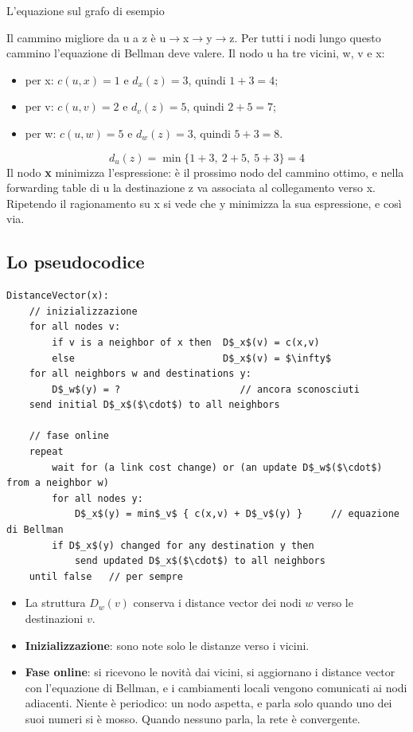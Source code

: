 \begin{esempio}{L'equazione sul grafo di esempio}
\begin{center}
\end{center}
Il cammino migliore da u a z è u$\rightarrow$x$\rightarrow$y$\rightarrow$z. Per tutti i nodi lungo questo cammino l'equazione di
Bellman deve valere. Il nodo u ha tre vicini, w, v e x:
\begin{itemize}
    \item per x: $c(u,x) = 1$ e $d_x(z) = 3$, quindi $1 + 3 = 4$;
    \item per v: $c(u,v) = 2$ e $d_v(z) = 5$, quindi $2 + 5 = 7$;
    \item per w: $c(u,w) = 5$ e $d_w(z) = 3$, quindi $5 + 3 = 8$.
\end{itemize}
$$d_u(z) = \min\{1+3,\ 2+5,\ 5+3\} = 4$$
Il nodo \textbf{x} minimizza l'espressione: è il prossimo nodo del cammino ottimo, e nella forwarding table di u la destinazione z
va associata al collegamento verso x. Ripetendo il ragionamento su x si vede che y minimizza la sua espressione, e così via.
\end{esempio}

\subsection{Lo pseudocodice}

\begin{lstlisting}[mathescape=true, title={Distance Vector, eseguito da ogni nodo $x$}]
DistanceVector(x):
    // inizializzazione
    for all nodes v:
        if v is a neighbor of x then  D$_x$(v) = c(x,v)
        else                          D$_x$(v) = $\infty$
    for all neighbors w and destinations y:
        D$_w$(y) = ?                     // ancora sconosciuti
    send initial D$_x$($\cdot$) to all neighbors

    // fase online
    repeat
        wait for (a link cost change) or (an update D$_w$($\cdot$) from a neighbor w)
        for all nodes y:
            D$_x$(y) = min$_v$ { c(x,v) + D$_v$(y) }     // equazione di Bellman
        if D$_x$(y) changed for any destination y then
            send updated D$_x$($\cdot$) to all neighbors
    until false   // per sempre
\end{lstlisting}

\begin{itemize}
    \item La struttura $D_w(v)$ conserva i distance vector dei nodi $w$ verso le destinazioni $v$.
    \item \textbf{Inizializzazione}: sono note solo le distanze verso i vicini.
    \item \textbf{Fase online}: si ricevono le novità dai vicini, si aggiornano i distance vector con l'equazione di Bellman, e i
          cambiamenti locali vengono comunicati ai nodi adiacenti. Niente è periodico: un nodo aspetta, e parla solo quando uno
          dei suoi numeri si è mosso. Quando nessuno parla, la rete è convergente.
\end{itemize}

